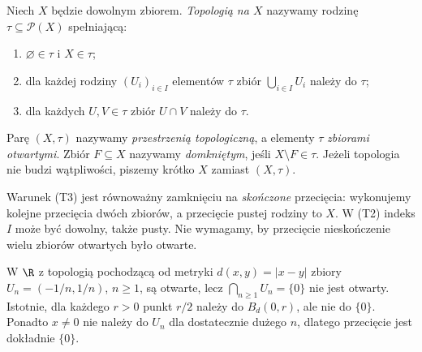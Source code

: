 \begin{definicja}
\label{def:topog-topologia}
Niech $X$ będzie dowolnym zbiorem. \emph{Topologią na $X$}
nazywamy rodzinę $\tau\subseteq\mathcal P(X)$ spełniającą:
\begin{enumerate}[label=(T\arabic*)]
\item $\varnothing\in\tau$ i $X\in\tau$;
\item dla każdej rodziny $(U_i)_{i\in I}$ elementów $\tau$
      zbiór $\bigcup_{i\in I}U_i$ należy do $\tau$;
\item dla każdych $U,V\in\tau$ zbiór $U\cap V$ należy do $\tau$.
\end{enumerate}
Parę $(X,\tau)$ nazywamy \emph{przestrzenią topologiczną},
a elementy $\tau$ \emph{zbiorami otwartymi}. Zbiór $F\subseteq X$
nazywamy \emph{domkniętym}, jeśli $X\setminus F\in\tau$.
Jeżeli topologia nie budzi wątpliwości, piszemy krótko $X$
zamiast $(X,\tau)$.
\end{definicja}

Warunek (T3) jest równoważny zamknięciu na \emph{skończone}
przecięcia: wykonujemy kolejne przecięcia dwóch zbiorów,
a przecięcie pustej rodziny to $X$. W (T2) indeks $I$
może być dowolny, także pusty. Nie wymagamy, by przecięcie
nieskończenie wielu zbiorów otwartych było otwarte.

\begin{przyklad}
\label{ex:topog-nieskonczone-przeciecie}
W $\R$ z topologią pochodzącą od metryki $d(x,y)=|x-y|$
zbiory $U_n=(-1/n,1/n)$, $n\geq1$, są otwarte, lecz
$\bigcap_{n\geq1}U_n=\{0\}$ nie jest otwarty.
Istotnie, dla każdego $r>0$ punkt $r/2$ należy do
$B_d(0,r)$, ale nie do $\{0\}$.
Ponadto $x\neq0$ nie należy do $U_n$ dla dostatecznie
dużego $n$, dlatego przecięcie jest dokładnie $\{0\}$.
\end{przyklad}

